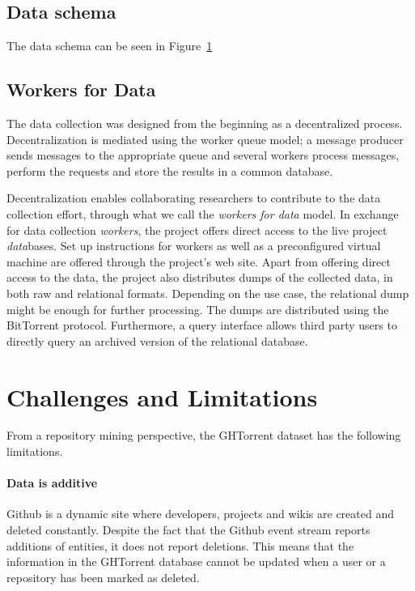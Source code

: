 \documentclass[conference]{IEEEtran}
\begin{document}
\subsection*{Data schema}

The data schema can be seen in Figure~\ref{}

\subsection*{Workers for Data}

The data collection was designed from the beginning as a decentralized process.
Decentralization is mediated using the worker queue model; a message producer
sends messages to the appropriate queue and several workers process messages,
perform the requests and store the results in a common database.

Decentralization enables collaborating researchers to contribute to the data
collection effort, through what we call the \emph{workers for data} model.  In
exchange for data collection \emph{workers}, the project offers direct access to
the live project \emph{data}bases. Set up instructions for workers as well as a
preconfigured virtual machine are offered through the project's web site. Apart
from offering direct access to the data, the project also distributes dumps of
the collected data, in both raw and relational formats. Depending on the use
case, the relational dump might be enough for further processing. The dumps are
distributed using the BitTorrent protocol. Furthermore, a query interface
allows third party users to directly query an archived version of the relational
database.

\section{Challenges and Limitations}

From a repository mining perspective, the GHTorrent dataset has the following
limitations. 

\paragraph*{Data is additive} Github is a dynamic site where developers, 
    projects and wikis are created and deleted constantly. Despite the fact
    that the Github event stream reports additions of entities, it does
    not report deletions. This means that the information in the GHTorrent 
    database cannot be updated when a user or a repository has been marked
    as deleted.
\end{document}

